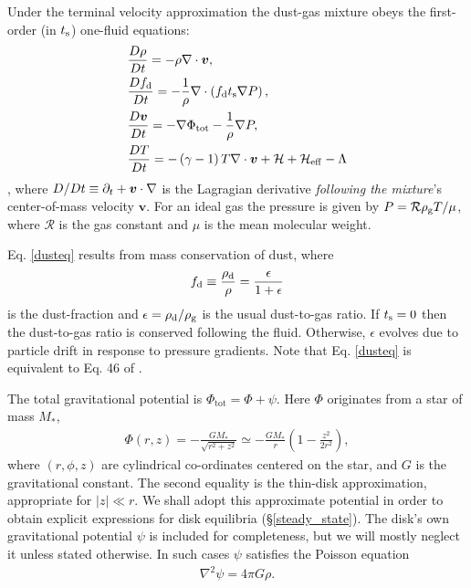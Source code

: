 
Under the terminal velocity approximation the dust-gas mixture obeys   
the first-order (in $t_\mathrm{s}$) one-fluid equations: 
\begin{align} 
  &\frac{D\rho}{Dt} = -\rho\nabla\cdot\bm{v}, \label{masseq}\\ 
   &\frac{Df_\mathrm{d}}{Dt} = -\frac{1}{\rho} \nabla \cdot \left(f_\mathrm{d} 
     t_\mathrm{s} \nabla P \right),\label{dusteq}\\
  &\frac{D\bm{v}}{Dt} = - \nabla\Phi_\mathrm{tot} - \frac{1}{\rho}\nabla  P, \label{momeq}\\ 
  &\frac{D T}{D t} = - \left(\gamma-1\right)T\nabla\cdot\bm{v} +
  \mathcal{H} + \mathcal{H}_\mathrm{eff}  - \Lambda  \label{tempeq} 
\end{align} 
\citep[see ][for a detailed derivation from the two-fluid
equations]{laibe14,price15}, where $D/Dt \equiv \partial_t +
\bm{v}\cdot\nabla$ is the Lagragian 
derivative \emph{following the mixture}'s center-of-mass velocity $\bm{v}$. 
For an ideal gas the pressure is given 
by $P = \mathcal{R}\rho_\mathrm{g} T/\mu $, where $\mathcal{R}$ is
the gas constant and $\mu$ is the mean molecular weight. 



Eq. \ref{dusteq} results from mass conservation of dust, where 
\begin{align}
  f_\mathrm{d} \equiv \frac{\rho_\mathrm{d}}{\rho}  = \frac{\epsilon}{1+\epsilon} 
\end{align}
is the dust-fraction and $\epsilon=\rho_\mathrm{d}/\rho_\mathrm{g}$ is the usual
dust-to-gas ratio. If $t_\mathrm{s}=0$ then the 
dust-to-gas ratio is conserved following the fluid. Otherwise, 
$\epsilon$ evolves due to particle drift in response to pressure
gradients. Note that Eq. \ref{dusteq} is equivalent to Eq. 46 of 
\cite{jacquet11}. 



The total gravitational potential is $\Phi_\mathrm{tot}=\Phi +
\psi$. Here $\Phi$ originates from a star of mass $M_*$, 
\begin{align}\label{thin_disk_potential}
  \Phi(r,z) =-\frac{GM_*}{\sqrt{r^2 + z^2}}\simeq
  -\frac{GM_*}{r}\left(1 - \frac{z^2}{2r^2}\right),  
\end{align}
where $(r,\phi, z)$ are cylindrical co-ordinates centered on the star, and 
$G$ is the gravitational constant. The second equality is the  
thin-disk approximation, appropriate for
$|z|\ll r$. We shall adopt this approximate potential in order to
obtain explicit expressions for disk equilibria (\S\ref{steady_state}). 
The disk's own gravitational potential $\psi$ is included for
completeness, but we will mostly neglect it unless stated
otherwise. In such cases $\psi$ satisfies the Poisson equation 
\begin{align}
  \nabla^2\psi = 4 \pi G \rho.\label{poisson}
\end{align}


